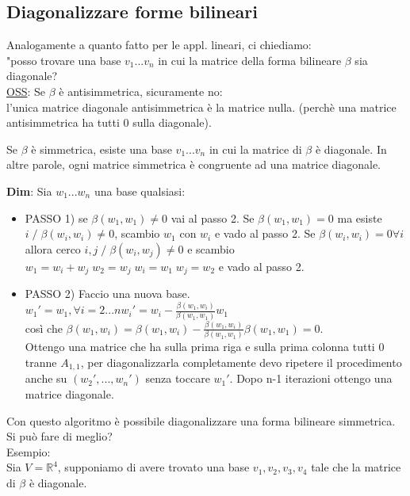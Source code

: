 \documentclass[12pt]{article}
\begin{document}
\subsection{Diagonalizzare forme bilineari}
Analogamente a quanto fatto per le appl. lineari, ci chiediamo:\\
"posso trovare una base $v_1...v_n$ in cui la matrice della forma bilineare $\beta$ sia diagonale?\\
\underline{OSS}: Se $\beta$ è antisimmetrica, sicuramente no:\\
l'unica matrice diagonale antisimmetrica è la matrice nulla. (perchè una matrice antisimmetrica ha tutti 0 sulla diagonale).\\
\begin{theorem}
    Se $\beta$ è simmetrica, esiste una base $v_1...v_n $ in cui la matrice di $\beta$ è diagonale. In altre parole, ogni matrice simmetrica è congruente ad una matrice diagonale.
    \label{diagonalizzare forma bilineare simmetrica}
\end{theorem}
\textbf{Dim}: Sia $w_1...w_n$ una base qualsiasi:
\begin{itemize}
    \item PASSO 1) se $\beta(w_1,w_1) \neq 0$ vai al passo 2. Se $\beta(w_1,w_1) = 0$ ma esiste $i \;/\; \beta(w_i,w_i) \neq 0$, scambio $w_1$ con $w_i$ e vado al passo 2. Se $\beta(w_i, w_i)=0 \forall i$ allora cerco $i,j \;/\; \beta(w_i, w_j) \neq 0$ e scambio $w_1 = w_i+w_j\; w_2 = w_j\; w_i = w_1\; w_j = w_2 $ e vado al passo 2.
    \item PASSO 2) Faccio una nuova base.\\
    $w_1' = w_1, \forall i=2...n w_i' = w_i-\frac{\beta(w_1,w_i)}{\beta(w_1,w_1)}w_1$\\
    così che $\beta(w_1, w_i) = \beta(w_1,w_i) - \frac{\beta(w_1,w_i)}{\beta(w_1,w_1)}\beta(w_1,w_1)=0$.\\
    Ottengo una matrice che ha sulla prima riga e sulla prima colonna tutti 0 tranne $A_{1,1}$, per diagonalizzarla completamente devo ripetere il procedimento anche su $(w_2',...,w_n')$ senza toccare $w_1'$. Dopo n-1 iterazioni ottengo una matrice diagonale.
\end{itemize}
Con questo algoritmo è possibile diagonalizzare una forma bilineare simmetrica. Si può fare di meglio?\\
Esempio:\\
Sia $V = \mathbb{R}^4$, supponiamo di avere trovato una base $v_1,v_2,v_3,v_4$ tale che la matrice di $\beta$ è diagonale.\\
\end{document}
